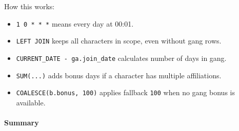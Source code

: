 \begin{Shaded}
\begin{Highlighting}[]
    \NormalTok{,}
    \NormalTok{,}
    \OperatorTok{=}\OperatorTok{+} \NormalTok{)}
    \NormalTok{ (}
 
            \NormalTok{(}\NormalTok{((} \OperatorTok{{-}}\NormalTok{)):}  
         
            \OperatorTok{=}
         
     \OperatorTok{=}
\NormalTok{);}
\end{Highlighting}
\end{Shaded}

How this works:

\begin{itemize}
\tightlist
\item
  \texttt{\textquotesingle{}1\ 0\ *\ *\ *\textquotesingle{}} means every
  day at 00:01.
\item
  \texttt{LEFT\ JOIN} keeps all characters in scope, even without gang
  rows.
\item
  \texttt{CURRENT\_DATE\ -\ ga.join\_date} calculates number of days in
  gang.
\item
  \texttt{SUM(...)} adds bonus days if a character has multiple
  affiliations.
\item
  \texttt{COALESCE(b.bonus,\ 100)} applies fallback \texttt{100} when no
  gang bonus is available.
\end{itemize}

\hypertarget{summary}{%
\paragraph{Summary}\label{summary}}

